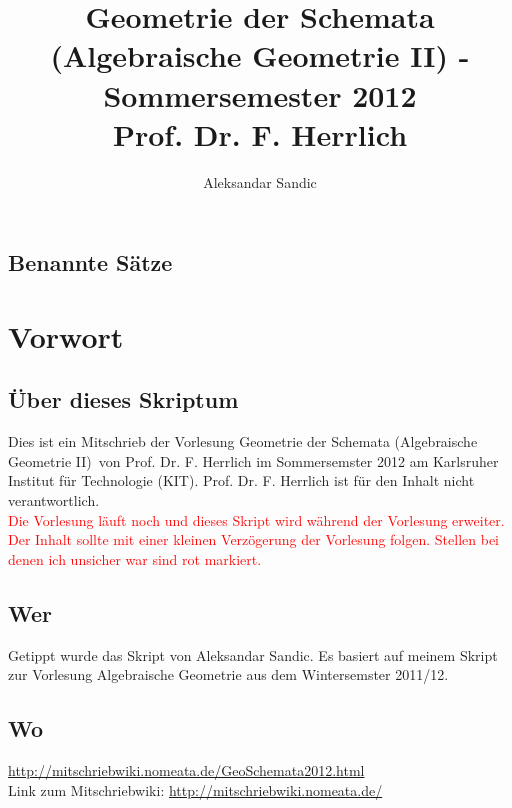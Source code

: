 \documentclass[a4paper,12pt]{report}
\title{Geometrie der Schemata (Algebraische Geometrie II)  - Sommersemester 2012\\ Prof. Dr. F. Herrlich}
\author{Aleksandar Sandic}
\theoremstyle{break}
\theoremstyle{nonumberbreak}
\theoremstyle{nonumberplain}
\begin{document}
\maketitle

\setlength\parskip{0.6pt}
\tableofcontents

\section*{Benannte S\"atze}


\setlength\parskip{\smallskipamount}



\chapter{Vorwort}
\setcounter{secnumdepth}{2}
\section*{\"Uber dieses Skriptum}
Dies ist ein Mitschrieb der Vorlesung \glqq Geometrie der Schemata (Algebraische Geometrie II)\grqq\ von Prof. Dr. F. Herrlich im Sommersemster 2012 am Karlsruher Institut f\"ur Technologie (KIT). Prof. Dr. F. Herrlich ist f\"ur  den Inhalt nicht verantwortlich.\\
\textcolor{red}{Die Vorlesung l\"auft noch und dieses Skript wird w\"ahrend der Vorlesung erweiter. Der Inhalt sollte mit einer kleinen Verz\"ogerung der Vorlesung folgen. Stellen bei denen ich unsicher war sind rot markiert.}
\section*{Wer}
Getippt wurde das Skript von Aleksandar Sandic. Es basiert auf meinem Skript zur Vorlesung Algebraische Geometrie aus dem Wintersemster 2011/12.

\section*{Wo}
\url{http://mitschriebwiki.nomeata.de/GeoSchemata2012.html}\\
Link zum Mitschriebwiki: \url{http://mitschriebwiki.nomeata.de/}
\end{document}
